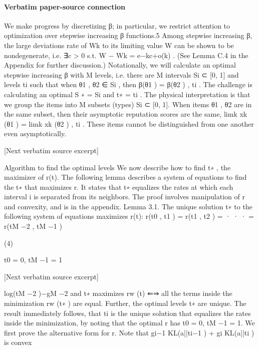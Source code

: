 \documentclass[10pt]{article}
\begin{document}
\paragraph{Verbatim paper-source connection}
\begin{ReviewVerbatim}
We make progress by discretizing β; in particular,
we restrict attention to optimization over stepwise
increasing β functions.5 Among stepwise increasing
β, the large deviations rate of Wk to its limiting
value W can be shown to be nondegenerate, i.e. ∃c >
0 s.t. W − Wk = e−kc+o(k) . (See Lemma C.4 in the
Appendix for further discussion.)
Notationally, we will calculate an optimal stepwise
increasing β with M levels, i.e. there are M intervals
Si ⊂ [0, 1] and levels ti such that when θ1 , θ2 ∈ Si ,
then β(θ1 ) = β(θ2 ) , ti . The challenge is calculating an optimal S ∗ = {Si } and t∗ = {ti }.
The physical interpretation is that we group the
items into M subsets (types) Si ⊂ [0, 1]. When
items θ1 , θ2 are in the same subset, then their asymptotic reputation scores are the same, limk xk (θ1 ) =
limk xk (θ2 ) , ti . These items cannot be distinguished from one another even asymptotically.

[Next verbatim source excerpt]


Algorithm to find the optimal levels We now
describe how to find t∗ , the maximizer of r(t).
The following lemma describes a system of equations
to find the t∗ that maximizes r. It states that t∗
equalizes the rates at which each interval i is separated from its neighbors. The proof involves manipulation of r and convexity, and is in the appendix.
Lemma 3.1. The unique solution t∗ to the following
system of equations maximizes r(t):
r(t0 , t1 ) = r(t1 , t2 ) = · · · = r(tM −2 , tM −1 )

(4)

t0 = 0, tM −1 = 1

[Next verbatim source excerpt]

log(tM −2 )−gM −2
and t∗ maximizes rw (t) ⇐⇒ all the terms inside the minimization rw (t∗ ) are equal. Further, the
optimal levels t∗ are unique. The result immediately follows, that {ti } is the unique solution that
equalizes the rates inside the minimization, by noting that the optimal r has t0 = 0, tM −1 = 1.
We first prove the alternative form for r. Note that {gi−1 KL(a||ti−1 ) + gi KL(a||ti )} is convex
\end{ReviewVerbatim}

\end{document}
